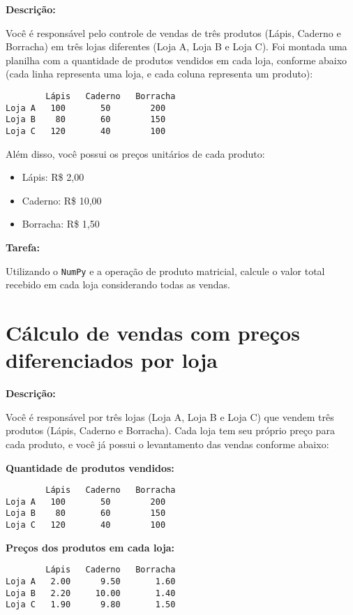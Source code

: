 \textbf{Descrição:}  

Você é responsável pelo controle de vendas de três produtos (Lápis, Caderno e Borracha) em três lojas diferentes (Loja A, Loja B e Loja C). Foi montada uma planilha com a quantidade de produtos vendidos em cada loja, conforme abaixo (cada linha representa uma loja, e cada coluna representa um produto):

\begin{verbatim}
        Lápis   Caderno   Borracha
Loja A   100       50        200
Loja B    80       60        150
Loja C   120       40        100
\end{verbatim}

Além disso, você possui os preços unitários de cada produto:

\begin{itemize}
    \item Lápis: R\$ 2,00
    \item Caderno: R\$ 10,00
    \item Borracha: R\$ 1,50
\end{itemize}

\textbf{Tarefa:}

Utilizando o \texttt{NumPy} e a operação de produto matricial, calcule o valor total recebido em cada loja considerando todas as vendas.


\section{Cálculo de vendas com preços diferenciados por loja}

\textbf{Descrição:}  

Você é responsável por três lojas (Loja A, Loja B e Loja C) que vendem três produtos (Lápis, Caderno e Borracha). Cada loja tem seu próprio preço para cada produto, e você já possui o levantamento das vendas conforme abaixo:

\textbf{Quantidade de produtos vendidos:}

\begin{verbatim}
        Lápis   Caderno   Borracha
Loja A   100       50        200
Loja B    80       60        150
Loja C   120       40        100
\end{verbatim}

\textbf{Preços dos produtos em cada loja:}

\begin{verbatim}
        Lápis   Caderno   Borracha
Loja A   2.00      9.50       1.60
Loja B   2.20     10.00       1.40
Loja C   1.90      9.80       1.50
\end{verbatim}

